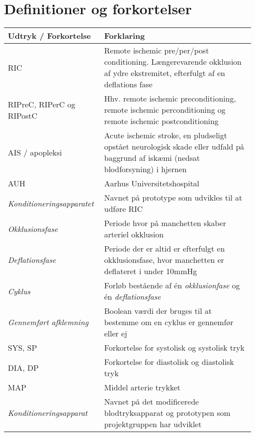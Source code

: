 \chapter*{Definitioner og forkortelser}
	\begin{longtable}{ |p{} |p{}| } 
		\hline
		\textbf{Udtryk / Forkortelse} &  \textbf{Forklaring} \\
		\hline
		RIC & Remote ischemic pre/per/post conditioning. Længerevarende okklusion af ydre ekstremitet, efterfulgt af en deflations fase\\
		\hline
		RIPreC, RIPerC og RIPostC & Hhv. remote ischemic preconditioning, remote ischemic perconditioning og remote ischemic postconditioning\\
		\hline
		AIS / apopleksi & Acute ischemic stroke, en pludseligt opstået neurologisk skade eller udfald på baggrund af iskæmi (nedsat blodforsyning) i hjernen \\
		\hline
		AUH & Aarhus Universitetshospital \\
		\hline
		\textit{Konditioneringsapparatet} & Navnet på prototype som udvikles til at udføre RIC \\
		\hline
		\textit{Okklusionsfase} & Periode hvor på manchetten skaber arteriel okklusion \\
		\hline
		\textit{Deflationsfase} & Periode der er altid er efterfulgt en okklusionsfase, hvor manchetten er deflateret i under 10mmHg\\
		\hline
		\textit{Cyklus} & Forløb bestående af én \textit{okklusionfase} og én \textit{deflationsfase} \\
		\hline
		\textit{Gennemført afklemning} & Boolean værdi der bruges til at bestemme om en cyklus er gennemfør eller ej \\
		\hline
		SYS, SP & Forkortelse for systolisk og systolisk tryk \\
		\hline
		DIA, DP & Forkortelse for diastolisk og diastolisk tryk \\
		\hline
		MAP & Middel arterie trykket \\
		\hline
		\textit{Konditioneringsapparat} & Navnet på det modificerede blodtryksapparat og prototypen som projektgruppen har udviklet \\
		\hline
	\end{longtable}
\newpage